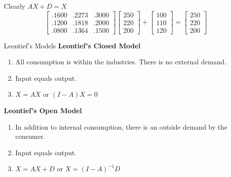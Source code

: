\begin{solution}
    Clearly \( AX + D = X \)
    \[ \begin{bmatrix}
            .1600 & .2273 & .3000 \\
            .1200 & .1818 & .2000 \\
            .0800 & .1364 & .1500
        \end{bmatrix} \begin{bmatrix}
            250 \\
            220 \\
            200
        \end{bmatrix} + \begin{bmatrix}
            100 \\
            110 \\
            120
        \end{bmatrix} = \begin{bmatrix}
            250 \\
            220 \\
            200
        \end{bmatrix} \]
\end{solution}



\begin{summarybox}{Leontief's Models}
    \textbf{Leontief's Closed Model}
    \begin{enumerate}
        \item All consumption is within the industries. There is no external demand.
        \item Input equals output.
        \item $X = AX$ or $(I - A)X = 0$
    \end{enumerate}

    \textbf{Leontief's Open Model}
    \begin{enumerate}
        \item In addition to internal consumption, there is an outside demand by the consumer.
        \item Input equals output.
        \item $X = AX + D$ or $X = (I - A)^{-1} D$
    \end{enumerate}
\end{summarybox}